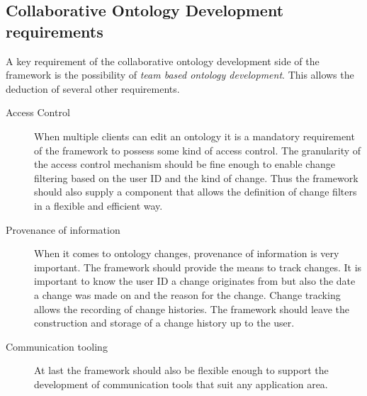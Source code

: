 \subsection{Collaborative Ontology Development requirements}
A key requirement of the collaborative ontology development side of the
framework is the possibility of \emph{team based ontology development}.
This allows the deduction of several other requirements.
\begin{description}
\item[Access Control] When multiple clients can edit an ontology it is a mandatory
        requirement of the framework to possess some kind of access control.
        The granularity of the access control mechanism should be fine enough to
        enable change filtering based on the user ID and the kind of change.
        Thus the framework should also supply a component that allows the
        definition of change filters in a flexible and efficient way.
\item[Provenance of information] When it comes to ontology changes, provenance of information is very important. The framework should provide the means to track
        changes. It is important to know the user ID a change originates from but also
        the date a change was made on and the reason for the change. Change tracking allows
        the recording of change histories. The framework should leave the construction
        and storage of a change history up to the user.
\item[Communication tooling] At last the framework should also be flexible enough
        to support the development of communication tools that suit any application area.
\end{description}

